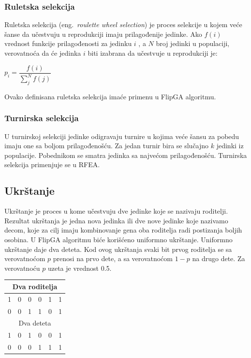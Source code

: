 \documentclass[a4paper]{article}
\begin{document}
\subsubsection{Ruletska selekcija}
\label{sec:ea_ruletska}
Ruletska selekcija (eng.~{\em roulette wheel selection}) \cite{vi_Janicic} je proces 
selekcije u kojem veće šanse da učestvuju u reprodukciji imaju prilagođenije jedinke.
Ako $f(i)$ vrednost funkcije prilagođenosti za jedinku $i$ , a $N$ broj jedinki u populaciji,
verovatnoća da će jedinka $i$ biti izabrana da učestvuje u reprodukciji je:

\begin{center}
$p_i = \dfrac{f(i)}{\sum_{j}^{N} f(j)} $
\end{center}
Ovako definisana ruletska selekcija imaće primenu u FlipGA algoritmu.

\subsubsection{Turnirska selekcija}
\label{sec:ea_turnirska}
U turnirskoj selekciji \cite{vi_Janicic} jedinke odigravaju turnire u kojima veće šansu za
pobedu imaju one sa boljom prilagođenošću. Za jedan turnir bira se slučajno $k$ jedinki iz
populacije. Pobednikom se smatra jedinka sa najvećom prilagođenošću. 
Turnirska selekcija primenjuje se u RFEA.

\subsection{Ukrštanje}
 \label{sec:ea_ukrstanje}
Ukrštanje \cite{vi_Janicic} je proces u kome učestvuju dve jedinke koje se nazivaju roditelji. 
Rezultat ukrštanja je jedna nova jedinka ili dve nove jedinke koje nazivamo decom, koje
za cilj imaju kombinovanje gena oba roditelja radi postizanja boljih osobina.
U FlipGA algoritmu biće korišćeno uniformno ukrštanje.
Uniformno ukrštanje daje dva deteta. Kod ovog ukrštanja svaki bit prvog roditelja 
se sa verovatnoćom $p$ prenosi na prvo dete, a sa verovatnoćom $1-p$ na drugo dete. 
Za verovatnoću $p$ uzeta je vrednost 0.5. 

\begin{table}[h!]
\centering
{}\label{tab:ea_ukrstanje} 
\begin{tabular}{|*{6}{c|}}
  \multicolumn{6}{c}{Dva roditelja} \\ \hline
  \rowcolor{Gray}  
  1 & 0 & 0 & 0 & 1 & 1 \\ \hline
  0 & 0 & 1 & 1 & 0 & 1 \\ \hline
  \multicolumn{6}{c}{Dva deteta} \\ \hline
  \cellcolor{Gray} 1 & 0 & 1 & \cellcolor{Gray} 0 & 0 & \cellcolor{Gray} 1 \\ \hline
  0 & \cellcolor{Gray} 0 & \cellcolor{Gray} 0 & 1 & \cellcolor{Gray} 1 & 1 \\ \hline
\end{tabular}
\end{table}
\end{document}
